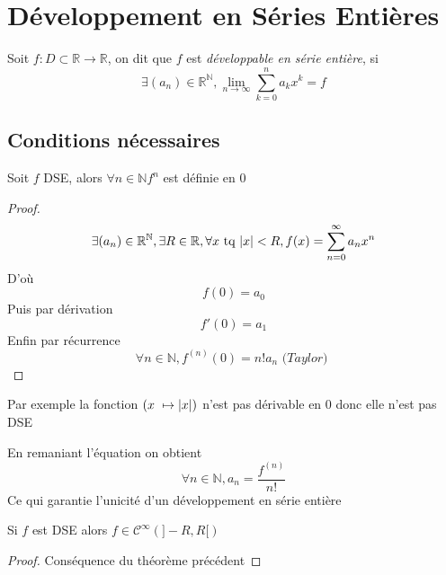 \documentclass[11pt,colorlinks]{book}
\theoremstyle{mytheoremstyle}
\theoremstyle{mytheoremstyle}
\theoremstyle{mytheoremstyle}
\theoremstyle{mytheoremstyle}
\theoremstyle{mytheoremstyle}
\theoremstyle{mytheoremstyle}
\theoremstyle{mytheoremstyle}
\theoremstyle{mytheoremstyle}
\theoremstyle{myproblemstyle}
\def\mbb#1{\mathbb{#1}}
\def\bN{\mbb{N}}
\def\bR{\mbb{R}}
\def\mC{\mathcal{C}}
\def\rN{\bR^{\bN}}
\newcommand{\func}[3]{#1\colon#2\to#3}
\begin{document}
\section{Développement en Séries Entières}
\begin{definition}
  Soit $\func{f}{D \subset \bR}{\bR}$, on dit que $f$ est \textit{développable en série entière}, si
  \begin{equation*}
    \exists (a_n) \in \rN, \lim_{n \to \infty} \sum_{k=0}^n a_k x^k = f
  \end{equation*}
\end{definition}
\subsection{Conditions nécessaires}
\begin{theorem}
  Soit $f$ DSE, alors $\forall n \in \bN f^{n}$ est définie en $0$
  \begin{proof}
  \begin{equation*}
    \exists (a_n) \in \rN, \exists R \in \bR, \forall x \text{ tq } \abs{x} < R, f(x) = \sum_{n=0}^{\infty} a_n x^n
  \end{equation*}
  D'où
  \begin{equation*}
    f(0) = a_0
  \end{equation*}
  Puis par dérivation
  \begin{equation*}
    f'(0) = a_1
  \end{equation*}
  Enfin par récurrence 
  \begin{equation*}
    \forall n \in \bN, f^{(n)}(0) = n! a_n \textit{ (Taylor) }
  \end{equation*}
\end{proof}
\end{theorem}
\begin{ex}
  Par exemple la fonction $\left(x \mapsto \abs{x}\right)$ n'est pas dérivable en $0$ donc elle n'est pas DSE
\end{ex}
\begin{rmq}
  En remaniant l'équation on obtient
  \begin{equation*}
    \forall n \in \bN, a_n = \frac{f^{(n)}}{n!}
  \end{equation*}
  Ce qui garantie l'unicité d'un développement en série entière 
\end{rmq}
\begin{prop}
  Si $f$ est DSE alors $f \in \mC^{\infty}(]-R,R[)$
  \begin{proof}
    Conséquence du théorème précédent
  \end{proof}
\end{prop}
\end{document}
